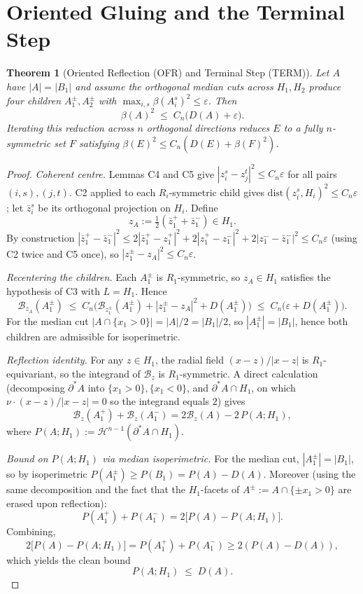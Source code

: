 \documentclass[11pt]{article}
\newtheorem{theorem}{Theorem}[section]
\newcommand{\B}{\mathcal{B}}
\newcommand{\cH}{\mathcal{H}}
\newcommand{\eps}{\varepsilon}
\begin{document}
\section{Oriented Gluing and the Terminal Step}

\begin{theorem}[Oriented Reflection (OFR) and Terminal Step (TERM)] \label{thm:OFR}
Let $A$ have $|A|=|B_1|$ and assume the orthogonal median cuts across $H_1, H_2$ produce four children $A_1^\pm, A_2^\pm$ with $\max_{i,s} \beta(A_i^s)^2 \le \eps$. Then
\[
   \beta(A)^2 \;\le\; C_n\bigl( D(A) + \eps \bigr).
\]
Iterating this reduction across $n$ orthogonal directions reduces $E$ to a fully $n$-symmetric set $F$ satisfying $\beta(E)^2 \le C_n(D(E) + \beta(F)^2)$.
\end{theorem}
\begin{proof}
\emph{Coherent centre.} Lemmas C4 and C5 give $|z_i^s - z_j^t|^2 \le C_n\eps$ for all pairs $(i,s), (j,t)$. C2 applied to each $R_i$-symmetric child gives $\mathrm{dist}(z_i^s, H_i)^2 \le C_n\eps$; let $\bar z_i^s$ be its orthogonal projection on $H_i$. Define
\[
  z_A := \tfrac12 (\bar z_1^+ + \bar z_1^-) \in H_1.
\]
By construction $|\bar z_1^+ - \bar z_1^-|^2 \le 2|\bar z_1^+ - z_1^+|^2 + 2|z_1^+ - z_1^-|^2 + 2|z_1^- - \bar z_1^-|^2 \le C_n\eps$ (using C2 twice and C5 once), so $|z_1^\pm - z_A|^2 \le C_n\eps$.

\smallskip
\emph{Recentering the children.} Each $A_1^\pm$ is $R_1$-symmetric, so $z_A \in H_1$ satisfies the hypothesis of C3 with $L = H_1$. Hence
\[
  \B_{z_A}(A_1^\pm) \;\le\; C_n\bigl(\B_{z_1^\pm}(A_1^\pm) + |z_1^\pm - z_A|^2 + D(A_1^\pm)\bigr) \;\le\; C_n\bigl(\eps + D(A_1^\pm)\bigr).
\]
For the median cut $|A \cap \{x_1>0\}| = |A|/2 = |B_1|/2$, so $|A_1^\pm| = |B_1|$, hence both children are admissible for isoperimetric.

\smallskip
\emph{Reflection identity.} For any $z \in H_1$, the radial field $(x-z)/|x-z|$ is $R_1$-equivariant, so the integrand of $\B_z$ is $R_1$-symmetric. A direct calculation (decomposing $\partial^* A$ into $\{x_1>0\}, \{x_1<0\}$, and $\partial^* A \cap H_1$, on which $\nu \cdot (x-z)/|x-z| = 0$ so the integrand equals $2$) gives
\[
  \B_z(A_1^+) + \B_z(A_1^-) = 2\B_z(A) - 2\,P(A; H_1),
\]
where $P(A;H_1) := \cH^{n-1}(\partial^* A \cap H_1)$.

\smallskip
\emph{Bound on $P(A;H_1)$ via median isoperimetric.} For the median cut, $|A_1^\pm| = |B_1|$, so by isoperimetric $P(A_1^\pm) \ge P(B_1) = P(A) - D(A)$. Moreover (using the same decomposition and the fact that the $H_1$-facets of $A^\pm := A \cap \{\pm x_1 > 0\}$ are erased upon reflection):
\[
  P(A_1^+) + P(A_1^-) = 2\bigl[P(A) - P(A; H_1)\bigr].
\]
Combining,
\[
  2\bigl[P(A) - P(A; H_1)\bigr] = P(A_1^+) + P(A_1^-) \ge 2(P(A) - D(A)),
\]
which yields the clean bound
\[
  \boxed{\,P(A; H_1) \;\le\; D(A).\,}
\]


\end{proof}
\end{document}
